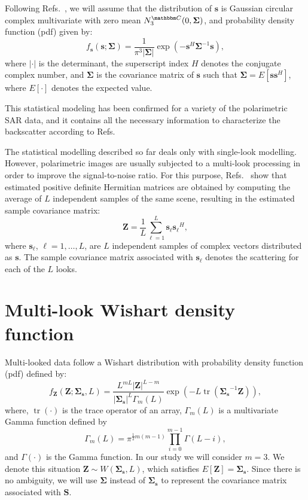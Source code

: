 \documentclass[conference]{IEEEtran}
\DeclareMathOperator{\traco}{tr}
\begin{document}
Following Refs.~\cite{good, lee}, we will assume that the distribution of $\mathbf{s}$ is Gaussian circular complex multivariate with zero mean $N^{\mathbbm C}_3(0,\mathbf{\Sigma})$, and probability density function (pdf) given by:
\begin{equation}
    f_{\mathbf{s}}(\mathbf{s};\mathbf{\Sigma})=\frac{1}{\pi^3|\mathbf{\Sigma}|} \exp(-\mathbf{s}^H\mathbf{\Sigma}^{-1}\mathbf{s}),
    \label{eq_02}
\end{equation}
where $|\cdot|$ is the determinant, 
the superscript index $H$ denotes the conjugate complex number, 
and $\mathbf{\Sigma}$ is the covariance matrix of $\mathbf{s}$ such that $\mathbf{\Sigma}=E[\mathbf{ss}^H]$, where $E[\cdot]$ denotes the expected value. 

This statistical modeling has been confirmed for a variety of the polarimetric SAR data, and it contains all the necessary information to characterize the backscatter according to Refs.~\cite{sarabendi,mfp}
 
The statistical modelling described so far deals only with single-look modelling.
However, polarimetric images are usually subjected to a multi-look processing in order to improve the signal-to-noise ratio. 
For this purpose, Refs.~\cite{good, ade} show that estimated positive definite Hermitian matrices are obtained by computing the average of $L$ independent samples of the same scene, resulting in the estimated sample covariance matrix:
\begin{equation}
    \mathbf{Z}=\frac{1}{L}\sum_{\ell=1}^{L} {\mathbf{s}_\ell}{\mathbf{s}_\ell}^H,
    \label{eq_03}
\end{equation}
where $\mathbf{s}_\ell$, $\ell = 1, \dots, L$, are $L$ independent samples of complex vectors distributed as $\mathbf{s}$. 
The sample covariance matrix associated with $\mathbf{s}_\ell$ denotes the scattering for each of the $L$ looks.

\section{Multi-look Wishart density function}\label{sec_03}

Multi-looked data follow a Wishart distribution with probability density function (pdf) defined by:
\begin{equation}
    f_{\mathbf{Z}}(\mathbf{Z};\mathbf{\Sigma_{s}},L)=\frac{L^{mL}|\mathbf{Z}|^{L-m}}{|\mathbf{\Sigma_{s}}|^{L}\Gamma_m(L)} \exp(-L\traco(\mathbf{\Sigma_{s}}^{-1}\mathbf{Z})),
    \label{eq_04}
\end{equation} 
where, $\traco(\cdot)$ is the trace operator of an array, $\Gamma_m(L)$ is a multivariate Gamma function defined by
\begin{equation*}
	\Gamma_m(L)=\pi^{\frac{1}{2}m(m-1)} \prod_{i=0}^{m-1}\Gamma(L-i),
\end{equation*}
and $\Gamma(\cdot)$ is the Gamma function.
In our study we will consider $m=3$. 
We denote this situation $\mathbf{Z}\sim W(\mathbf{\Sigma_{s}}, L)$, which satisfies $E[\mathbf{Z}]=\mathbf{\Sigma_{s}}$. 
Since there is no ambiguity, we will use $\mathbf{\Sigma}$ instead of $\mathbf{\Sigma_{s}}$ to represent the covariance matrix associated with $\mathbf{S}$.
\end{document}
